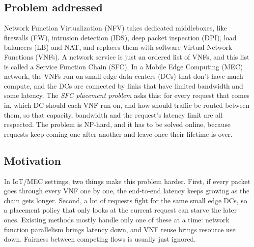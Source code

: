 \documentclass[11pt,a4paper]{article}
\begin{document}
\subsection{Problem addressed}
Network Function Virtualization (NFV) takes dedicated middleboxes, like
firewalls (FW), intrusion detection (IDS), deep packet inspection (DPI), load
balancers (LB) and NAT, and replaces them with software Virtual Network
Functions (VNFs). A network service is just an ordered list of VNFs, and this
list is called a Service Function Chain (SFC). In a Mobile Edge Computing (MEC)
network, the VNFs run on small edge data centers (DCs) that don't have much
compute, and the DCs are connected by links that have limited bandwidth and some
latency. The \emph{SFC placement problem} asks this: for every request that
comes in, which DC should each VNF run on, and how should traffic be routed
between them, so that capacity, bandwidth and the request's latency limit are
all respected. The problem is NP-hard, and it has to be solved online, because
requests keep coming one after another and leave once their lifetime is over.

\subsection{Motivation}
In IoT/MEC settings, two things make this problem harder. First, if every packet
goes through every VNF one by one, the end-to-end latency keeps growing as the
chain gets longer. Second, a lot of requests fight for the same small edge DCs,
so a placement policy that only looks at the current request can starve the
later ones. Existing methods mostly handle only one of these at a time: network
function parallelism brings latency down, and VNF reuse brings resource use
down. Fairness between competing flows is usually just ignored.
\end{document}
